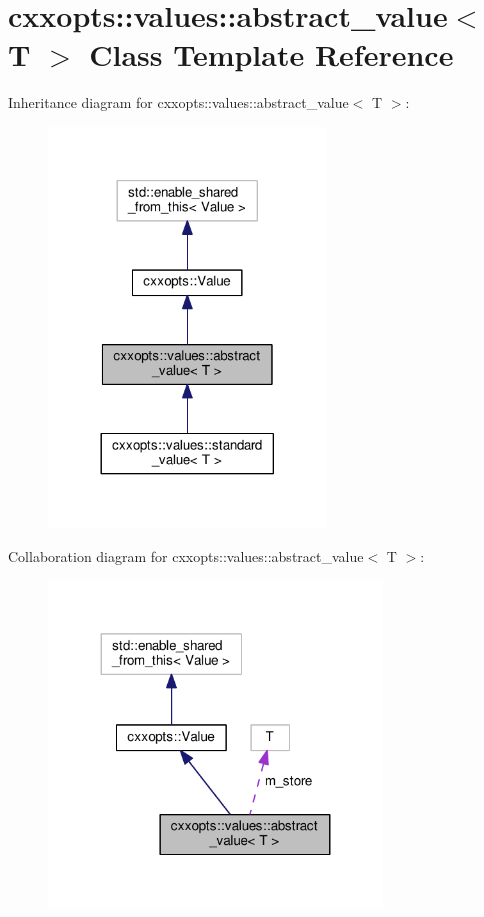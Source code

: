 \hypertarget{classcxxopts_1_1values_1_1abstract__value}{}\section{cxxopts\+:\+:values\+:\+:abstract\+\_\+value$<$ T $>$ Class Template Reference}
\label{classcxxopts_1_1values_1_1abstract__value}


Inheritance diagram for cxxopts\+:\+:values\+:\+:abstract\+\_\+value$<$ T $>$\+:
\nopagebreak
\begin{figure}[H]
\begin{center}
\leavevmode
\includegraphics[width=209pt]{classcxxopts_1_1values_1_1abstract__value__inherit__graph}
\end{center}
\end{figure}


Collaboration diagram for cxxopts\+:\+:values\+:\+:abstract\+\_\+value$<$ T $>$\+:
\nopagebreak
\begin{figure}[H]
\begin{center}
\leavevmode
\includegraphics[width=251pt]{classcxxopts_1_1values_1_1abstract__value__coll__graph}
\end{center}
\end{figure}

